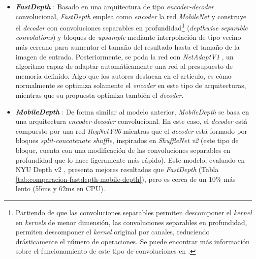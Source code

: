 \documentclass[a4paper]{article}
\newcommand{\textbfit}[1]{\textbf{\textit{#1}}}
\begin{document}
\begin{itemize}
    \item \textbfit{FastDepth} \cite{icra_2019_fastdepth}: Basado en una arquitectura de tipo \textit{encoder-decoder} convolucional, \textit{FastDepth} emplea como \textit{encoder} la red \textit{MobileNet} \cite{mobilenets} y construye el \textit{decoder} con convoluciones separables en profundidad\footnote{Partiendo de que las convoluciones separables permiten descomponer el \textit{kernel} en \textit{kernels}  de menor dimensión, las convoluciones separables en profundidad, permiten descomponer el \textit{kernel} original por canales, reduciendo drásticamente el número de operaciones. Se puede encontrar más información sobre el funcionamiento de este tipo de convoluciones en \cite{mobilenets}.} (\textit{depthwise separable convolutions}) y bloques de \textit{upsample} mediante interpolación de tipo vecino más cercano para aumentar el tamaño del resultado hasta el tamaño de la imagen de entrada. Posteriormente, se poda la red con \textit{NetAdaptV1} \cite{eccv_2018_yang_netadapt}, un algoritmo capaz de adaptar automáticamente una red al presupuesto de memoria definido. Algo que los autores destacan en el artículo, es cómo normalmente se optimiza solamente el \textit{encoder} en este tipo de arquitecturas, mientras que su propuesta optimiza también el \textit{decoder}.
    
    \item \textbfit{MobileDepth} \cite{wang2020mobiledepth}: De forma similar al modelo anterior, \textit{MobileDepth} se basa en una arquitectura \textit{encoder-decoder} convolucional. En este caso, el \textit{decoder} está compuesto por una red \textit{RegNetY06} \cite{regnety} mientras que el \textit{decoder} está formado por bloques \textit{split-concatenate shuffle}, inspirados en \textit{ShuffleNet v2} (este tipo de bloque, cuenta con una modificación de las convoluciones separables en profundidad que lo hace ligeramente más rápido). Este modelo, evaluado en NYU Depth v2 \cite{nyudepthv2}, presenta mejores resultados que \textit{FastDepth} (Tabla \ref{tab:comparacion-fastdepth-mobile-depth}), pero es cerca de un 10\% más lento (55ms y 62ms en CPU).
    

\end{itemize}
\end{document}
